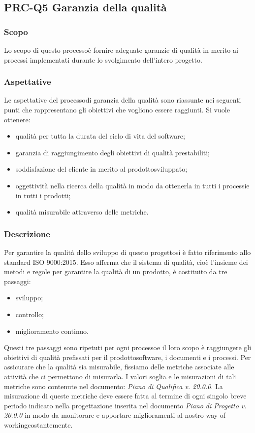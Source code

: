\subsection{PRC-Q5 Garanzia della qualità}
\subsubsection{Scopo}
Lo scopo di questo processo\glosp è fornire adeguate garanzie di qualità in merito ai processi implementati durante lo svolgimento dell'intero progetto\glo.
\subsubsection{Aspettative}
Le aspettative del processo\glosp di garanzia della qualità sono riassunte nei seguenti punti che rappresentano gli obiettivi che vogliono essere raggiunti. Si vuole ottenere:
\begin{itemize}
	\item qualità per tutta la durata del ciclo di vita del software;
	\item garanzia di raggiungimento degli obiettivi di qualità prestabiliti;
	\item soddisfazione del cliente in merito al prodotto\glosp sviluppato;
	\item oggettività nella ricerca della qualità in modo da ottenerla in tutti i processi\glosp e in tutti i prodotti\glo;
	\item qualità misurabile attraverso delle metriche\glo.
\end{itemize}
\subsubsection{Descrizione}
Per garantire la qualità dello sviluppo di questo progetto\glosp si è fatto riferimento allo standard ISO 9000:2015. Esso afferma che il sistema di qualità, cioè l'insieme dei metodi e regole per garantire la qualità di un prodotto\glo, è costituito da tre passaggi:
\begin{itemize}
	\item sviluppo;
	\item controllo;
	\item miglioramento continuo.
\end{itemize}
Questi tre passaggi sono ripetuti per ogni processo\glosp e il loro scopo è raggiungere gli obiettivi di qualità prefissati per il prodotto\glosp software, i documenti e i processi.
Per assicurare che la qualità sia misurabile, fissiamo delle metriche associate alle attività che ci permettono di misurarla. I valori soglia e le misurazioni di tali metriche sono contenute nel documento: \textit{Piano di Qualifica v. 20.0.0}.
La misurazione di queste metriche deve essere fatta al termine di ogni singolo breve periodo indicato nella progettazione inserita nel documento \textit{Piano di Progetto v. 20.0.0} in modo da monitorare e apportare miglioramenti al nostro way of working\glosp costantemente.
